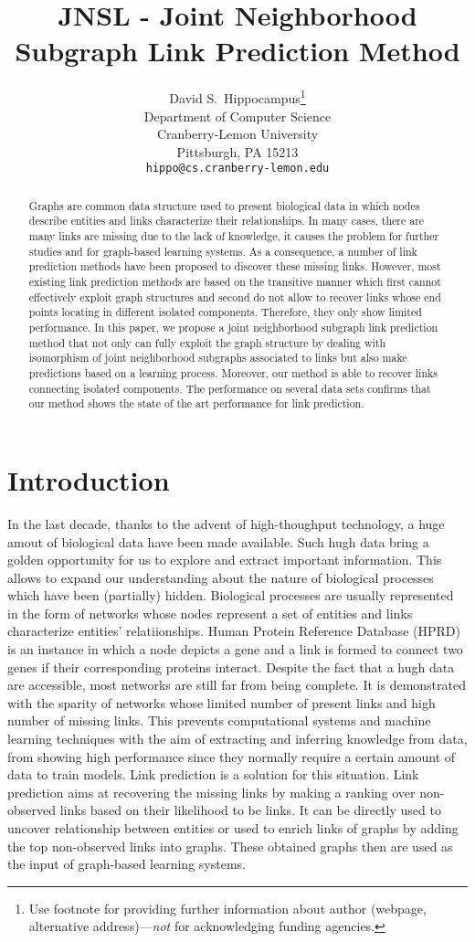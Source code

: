 \documentclass{article}
\title{JNSL - Joint Neighborhood Subgraph Link Prediction Method}
\author{
  David S.~Hippocampus\thanks{Use footnote for providing further
    information about author (webpage, alternative
    address)---\emph{not} for acknowledging funding agencies.} \\
  Department of Computer Science\\
  Cranberry-Lemon University\\
  Pittsburgh, PA 15213 \\
  \texttt{hippo@cs.cranberry-lemon.edu} \\
}
\begin{document}

\maketitle

\begin{abstract}
Graphs are common data structure used to present biological data in which nodes describe entities and links characterize their relationships. In many cases, there are many links are missing due to the lack of knowledge, it causes the problem for further studies and for graph-based learning systems. As a consequence, a number of link prediction methods have been proposed to discover these missing links. However, most existing link prediction methods are based on the transitive manner which first cannot effectively exploit graph structures and second do not allow to recover links whose end points locating in different isolated components. Therefore, they only show limited performance. In this paper, we propose a joint neighborhood subgraph link prediction method that not only can fully exploit the graph structure by dealing with isomorphism of joint neighborhood subgraphs associated to links but also make predictions based on a learning process. Moreover, our method is able to recover links connecting isolated components. The performance on several data sets confirms that our method shows the state of the art performance for link prediction.
\end{abstract}
\section{Introduction} 
In the last decade, thanks to the advent of high-thoughput technology, a huge amout of biological data have been made available. Such hugh data bring a golden opportunity for us to explore and extract important information. This allows to expand our understanding about the nature of biological processes which have been (partially) hidden. Biological processes are usually represented in the form of networks whose nodes represent a set of entities and links characterize entities' relatiionships. Human Protein Reference Database (HPRD) \cite{hprd} is an instance in which a node depicts a gene and a link is formed to connect two genes if their corresponding proteins interact. Despite the fact that a hugh data are accessible, most networks are still far from being complete. It is demonstrated with the sparity of networks whose limited number of present links and high number of missing links. This prevents computational systems and machine learning techniques with the aim of extracting and inferring knowledge from data, from showing high performance since they normally require a certain amount of data to train models. Link prediction is a solution for this situation. Link prediction aims at recovering the missing links by making a ranking over non-observed links based on their likelihood to be links. It can be directly used to uncover relationship between entities or used to enrich links of graphs by adding the top non-observed links into graphs. These obtained graphs then are used as the input of graph-based learning systems.
\end{document}
